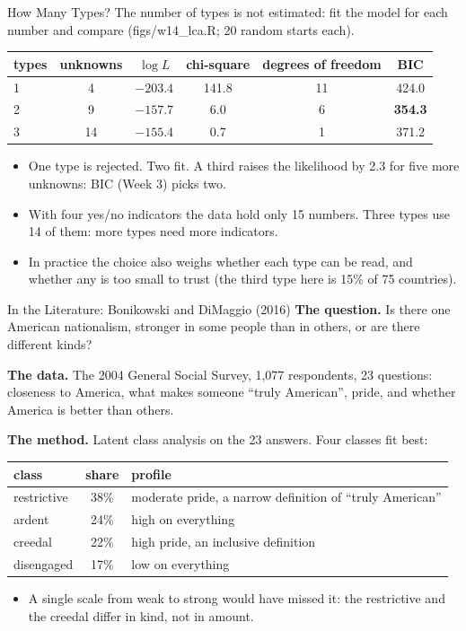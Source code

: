 \documentclass[aspectratio=169,11pt,xcolor=dvipsnames]{beamer}
\newcommand{\srcp}[1]{{\scriptsize\color{gray}(#1)}}
\begin{document}
\begin{frame}{How Many Types?}
The number of types is not estimated: fit the model for each number and compare
\srcp{figs/w14\_lca.R; 20 random starts each}.
\begin{center}\small
\renewcommand{\arraystretch}{1.12}
\begin{tabular}{@{}lccccc@{}}
\toprule
types & unknowns & $\log L$ & chi-square & degrees of freedom & BIC \\
\midrule
1 & 4 & $-203.4$ & 141.8 & 11 & 424.0 \\
2 & 9 & $-157.7$ & 6.0 & 6 & \textbf{354.3} \\
3 & 14 & $-155.4$ & 0.7 & 1 & 371.2 \\
\bottomrule
\end{tabular}
\end{center}
\begin{itemize}\itemsep4pt
  \item One type is rejected. Two fit. A third raises the likelihood by 2.3 for five more
        unknowns: BIC (Week 3) picks two.
  \item With four yes/no indicators the data hold only 15 numbers. Three types use 14 of them:
        more types need more indicators.
  \item In practice the choice also weighs whether each type can be read, and whether any is too
        small to trust (the third type here is 15\% of 75 countries).
\end{itemize}
\end{frame}

\begin{frame}{In the Literature: Bonikowski and DiMaggio (2016)}
\textbf{The question.} Is there one American nationalism, stronger in some people than in
others, or are there different kinds?
\par\vskip3pt
\textbf{The data.} The 2004 General Social Survey, 1,077 respondents, 23 questions: closeness to
America, what makes someone ``truly American'', pride, and whether America is better than others.
\par\vskip3pt
\textbf{The method.} Latent class analysis on the 23 answers. Four classes fit best:
\begin{center}\small
\renewcommand{\arraystretch}{1.1}
\begin{tabular}{@{}lcl@{}}
\toprule
class & share & profile \\
\midrule
restrictive & 38\% & moderate pride, a narrow definition of ``truly American'' \\
ardent & 24\% & high on everything \\
creedal & 22\% & high pride, an inclusive definition \\
disengaged & 17\% & low on everything \\
\bottomrule
\end{tabular}
\end{center}
\begin{itemize}\itemsep3pt
  \item A single scale from weak to strong would have missed it: the restrictive and the creedal
        differ in kind, not in amount.
\end{itemize}
\end{frame}
\end{document}
